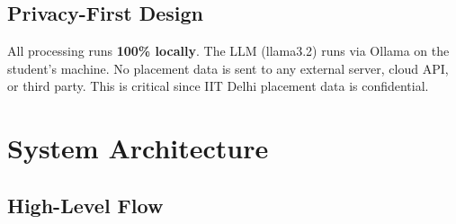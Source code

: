 \documentclass[12pt, a4paper]{article}
\begin{document}
\subsection{Privacy-First Design}

\begin{notebox}
All processing runs \textbf{100\% locally}. The LLM (llama3.2) runs via Ollama on the student's machine. No placement data is sent to any external server, cloud API, or third party. This is critical since IIT Delhi placement data is confidential.
\end{notebox}

\section{System Architecture}

\subsection{High-Level Flow}
\end{document}
